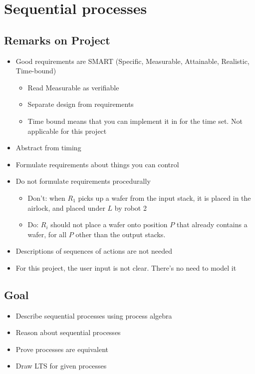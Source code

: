 
\section{Sequential processes}

\subsection{Remarks on Project}
\begin{itemize}
  \item Good requirements are SMART (Specific, Measurable, Attainable, Realistic, Time-bound)
  \begin{itemize}
    \item Read Measurable as verifiable
    \item Separate design from requirements
    \item Time bound means that you can implement it in for the time set. Not applicable for this
    project
  \end{itemize}
  \item Abstract from timing
  \item Formulate requirements about things you can control
  \item Do not formulate requirements procedurally
  \begin{itemize}
    \item Don't: when $R_1$ picks up a wafer from the input stack, it is placed in the airlock,
    and placed under $L$ by robot 2
    \item Do: $R_i$ should not place a wafer onto position $P$ that already contains a wafer,
    for all $P$ other than the output stacks.
  \end{itemize}
  \item Descriptions of sequences of actions are not needed
  \item For this project, the user input is not clear. There's no need to model it
\end{itemize}

\subsection{Goal}

\begin{itemize}
  \item Describe sequential processes using process algebra
  \item Reason about sequential processes
  \item Prove processes are equivalent
  \item Draw LTS for given processes
\end{itemize}

